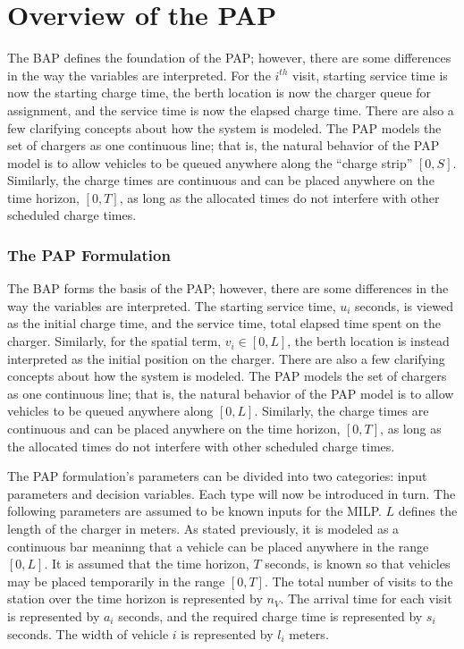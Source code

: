 \documentclass[ee,thesis]{usuthesis}
\begin{document}
\section{Overview of the PAP}
\label{sec:overview-of-the-pap}
The BAP defines the foundation of the PAP; however, there are some differences in the way the variables are interpreted. For
the \(i^{th}\) visit, starting service time is now the starting charge time, the berth location is now the charger queue
for assignment, and the service time is now the elapsed charge time. There are also a few clarifying concepts about how
the system is modeled. The PAP models the set of chargers as one continuous line; that is, the natural behavior of the
PAP model is to allow vehicles to be queued anywhere along the ``charge strip'' \([0,S]\). Similarly, the charge times are
continuous and can be placed anywhere on the time horizon, \([0,T]\), as long as the allocated times do not interfere with
other scheduled charge times.

\subsubsection{The PAP Formulation}
\label{sec:the-pap-formulation}
The BAP forms the basis of the PAP; however, there are some differences in the way the variables are interpreted. The
starting service time, \(u_i\) seconds, is viewed as the initial charge time, and the service time, total elapsed time
spent on the charger. Similarly, for the spatial term, \(v_i \in [0,L]\), the berth location is instead interpreted as the
initial position on the charger. There are also a few clarifying concepts about how the system is modeled. The PAP
models the set of chargers as one continuous line; that is, the natural behavior of the PAP model is to allow vehicles
to be queued anywhere along \([0,L]\). Similarly, the charge times are continuous and can be placed anywhere on the time
horizon, \([0,T]\), as long as the allocated times do not interfere with other scheduled charge times.

The PAP formulation's parameters can be divided into two categories: input parameters and decision variables. Each type
will now be introduced in turn. The following parameters are assumed to be known inputs for the MILP. \(L\) defines the
length of the charger in meters. As stated previously, it is modeled as a continuous bar meaninng that a vehicle can be
placed anywhere in the range \([0,L]\). It is assumed that the time horizon, \(T\) seconds, is known so that vehicles may be
placed temporarily in the range \([0,T]\). The total number of visits to the station over the time horizon is represented
by \(n_V\). The arrival time for each visit is represented by \(a_i\) seconds, and the required charge time is represented
by \(s_i\) seconds. The width of vehicle \(i\) is represented by \(l_i\) meters.
\end{document}
